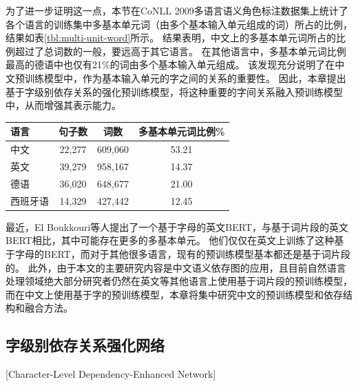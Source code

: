 为了进一步证明这一点，本节在CoNLL 2009\cite{hajic-etal-2009-conll}多语言语义角色标注数据集上统计了各个语言的训练集中多基本单元词（由多个基本输入单元组成的词）所占的比例，结果如表\ref{tbl:multi-unit-word}所示。
结果表明，中文上的多基本单元词所占的比例超过了总词数的一般，要远高于其它语言。
在其他语言中，多基本单元词比例最高的德语中也仅有21\%的词由多个基本输入单元组成。
该发现充分说明了在中文预训练模型中，作为基本输入单元的字之间的关系的重要性。
因此，本章提出基于字级别依存关系的强化预训练模型，将这种重要的字间关系融入预训练模型中，从而增强其表示能力。

\begin{table}[htpb]
    \vspace{0.5em}\centering\wuhao
    \begin{tabular}{lccc}
        \toprule[1.5pt]
        语言 & 句子数 & 词数 & 多基本单元词比例\%  \\
        \midrule[1pt]
        中文  & 22,277  & 609,060  & 53.21 \\
        英文  & 39,279  & 958,167  & 14.37 \\
        德语   & 36,020  & 648,677  & 21.00 \\
        西班牙语 & 14,329  & 427,442  & 12.45 \\
        \bottomrule[1.5pt]
    \end{tabular}
\end{table}

最近，El Boukkouri等人\cite{el-boukkouri-etal-2020-characterbert}提出了一个基于字母的英文BERT，与基于词片段的英文BERT相比，其中可能存在更多的多基本单元。
他们仅仅在英文上训练了这种基于字母的BERT，而对于其他很多语言，现有的预训练模型基本都还是基于词片段的。
此外，由于本文的主要研究内容是中文语义依存图的应用，且目前自然语言处理领域绝大部分研究者仍然在英文等其他语言上使用基于词片段的预训练模型，而在中文上使用基于字的预训练模型，本章将集中研究中文的预训练模型和依存结构和融合方法。

\subsection{字级别依存关系强化网络}[Character-Level Dependency-Enhanced Network]
\label{sec:chapter5-char-level-dep-infusion}


